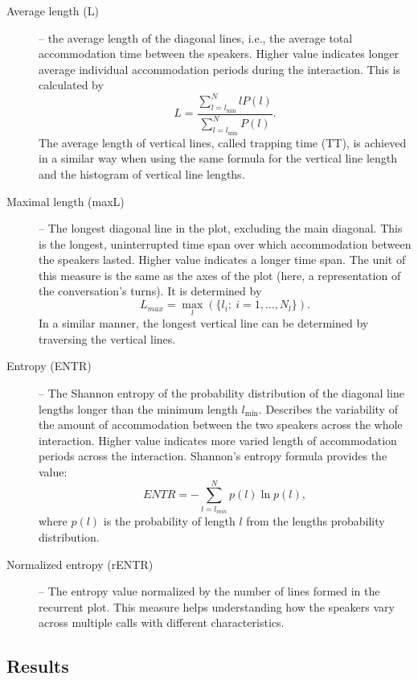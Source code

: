 \begin{description}
	\item[Average length (L)] -- the average length of the diagonal lines, i.e., the average total accommodation time between the speakers.
	Higher value indicates longer average individual accommodation periods during the interaction.
	This is calculated by
	\begin{equation}
		\label{eq:l}
		L = \frac{\sum_{l=l_{\min}}^N l P(l)}{\sum_{l=l_{\min}}^N P(l)}.
	\end{equation}
	The average length of vertical lines, called trapping time (TT), is achieved in a similar way when using the same formula for the vertical line length and the histogram of vertical line lengths.
	
	\item[Maximal length (maxL)] -- The longest diagonal line in the plot, excluding the main diagonal.	
	This is the longest, uninterrupted time span over which accommodation between the speakers lasted.
	Higher value indicates a longer time span.
	The unit of this measure is the same as the axes of the plot (here, a representation of the conversation's turns).
	It is determined by
	\begin{equation}
		\label{eq:maxl}
		L_{max} = \max_{l} (\{l_i; \ i=1, \ldots, N_l\}).
	\end{equation}
	In a similar manner, the longest vertical line can be determined by traversing the vertical lines.
	
	\item[Entropy (ENTR)] -- The Shannon entropy of the probability distribution of the diagonal line lengths longer than the minimum length $l_{\min}$.
	Describes the variability of the amount of accommodation between the two speakers across the whole interaction.
	Higher value indicates more varied length of accommodation periods across the interaction.
	Shannon's entropy formula provides the value:
	\begin{equation}
		\label{eq:entr}
		ENTR = -\sum_{l=l_{min}}^{N} p(l) \ln p(l),
	\end{equation}
	where $p(l)$ is the probability of length $l$ from the lengths probability distribution.
	\item[Normalized entropy (rENTR)] -- The entropy value normalized by the number of lines formed in the recurrent plot.
	This measure helps understanding how the speakers vary across multiple calls with different characteristics.
\end{description}
%

\subsection{Results}
\label{subsec:results}

